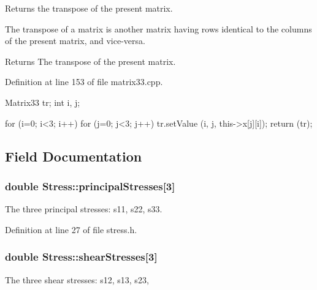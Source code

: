 \-Returns the transpose of the present matrix. 

\-The transpose of a matrix is another matrix having rows identical to the columns of the present matrix, and vice-\/versa. \begin{DoxyReturn}{\-Returns}
\-The transpose of the present matrix. 
\end{DoxyReturn}


\-Definition at line 153 of file matrix33.\-cpp.


\begin{DoxyCode}
{
  Matrix33 tr;
  int i, j;

  for (i=0; i<3; i++)
    {
      for (j=0; j<3; j++)
        {
          tr.setValue (i, j, this->x[j][i]);
        }
    }
  return (tr);
}
\end{DoxyCode}


\subsection{\-Field \-Documentation}
\hypertarget{classStress_aea8c3e40aa59a89d7ba79d2c916050a6}{
\subsubsection[{principal\-Stresses}]{\setlength{\rightskip}{0pt plus 5cm}double {\bf \-Stress\-::principal\-Stresses}\mbox{[}3\mbox{]}}}\label{d1/d1c/classStress_aea8c3e40aa59a89d7ba79d2c916050a6}
\-The three principal stresses\-: s11, s22, s33. 

\-Definition at line 27 of file stress.\-h.

\hypertarget{classStress_a77e8705e56c2fb56826a638edf3f78bf}{
\subsubsection[{shear\-Stresses}]{\setlength{\rightskip}{0pt plus 5cm}double {\bf \-Stress\-::shear\-Stresses}\mbox{[}3\mbox{]}}}\label{d1/d1c/classStress_a77e8705e56c2fb56826a638edf3f78bf}
\-The three shear stresses\-: s12, s13, s23, 

